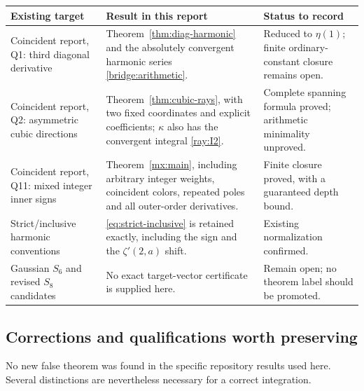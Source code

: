 \begin{longtable}{@{}>{\raggedright\arraybackslash}p{}>{\raggedright\arraybackslash}p{}>{\raggedright\arraybackslash}p{}@{}}
\toprule
Existing target & Result in this report & Status to record\\
\midrule
\endhead
Coincident report, Q1: third diagonal derivative
& Theorem~\ref{thm:diag-harmonic} and the absolutely convergent
harmonic series \eqref{bridge:arithmetic}.
& Reduced to $\eta(1)$; finite ordinary-constant closure remains open.\\[5pt]
Coincident report, Q2: asymmetric cubic directions
& Theorem~\ref{thm:cubic-rays}, with two fixed coordinates and
explicit coefficients; $\kappa$ also has the convergent integral
\eqref{ray:I2}.
& Complete spanning formula proved; arithmetic minimality unproved.\\[5pt]
Coincident report, Q11: mixed integer inner signs
& Theorem~\ref{mx:main}, including arbitrary integer weights,
coincident colors, repeated poles and all outer-order derivatives.
& Finite closure proved, with a guaranteed depth bound.\\[5pt]
Strict/inclusive harmonic conventions
& \eqref{eq:strict-inclusive} is retained exactly, including
the sign and the $\zeta'(2,a)$ shift.
& Existing normalization confirmed.\\[5pt]
Gaussian $S_6$ and revised $S_8$ candidates
& No exact target-vector certificate is supplied here.
& Remain open; no theorem label should be promoted.\\
\bottomrule
\end{longtable}

\subsection{Corrections and qualifications worth preserving}

No new false theorem was found in the specific repository results
used here. Several distinctions are nevertheless necessary for a
correct integration.

